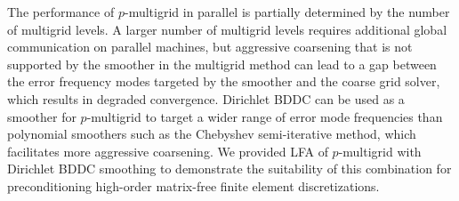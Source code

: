 The performance of $p$-multigrid in parallel is partially determined by the number of multigrid levels.
A larger number of multigrid levels requires additional global communication on parallel machines, but aggressive coarsening that is not supported by the smoother in the multigrid method can lead to a gap between the error frequency modes targeted by the smoother and the coarse grid solver, which results in degraded convergence.
Dirichlet BDDC can be used as a smoother for $p$-multigrid to target a wider range of error mode frequencies than polynomial smoothers such as the Chebyshev semi-iterative method, which facilitates more aggressive coarsening.
We provided LFA of $p$-multigrid with Dirichlet BDDC smoothing to demonstrate the suitability of this combination for preconditioning high-order matrix-free finite element discretizations.